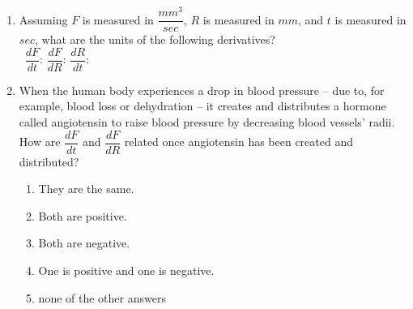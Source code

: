 \documentclass[10pt]{article}
\begin{document}
\begin{enumerate}
\item[(a)] Assuming $F$ is measured in $\dfrac{mm^3}{sec}$, $R$ is measured in $mm$, and $t$ is measured in $sec$, what are the units of the following derivatives?\\
\,
\hfill
{\large $\dfrac{dF}{dt}$:}
\hfill
{\large $\dfrac{dF}{dR}$: }
\hfill
{\large $\dfrac{dR}{dt}$: }
\hfill
\,\\[0.2in]

\item[(b)] When the human body experiences a drop in blood pressure -- due to, for example, blood loss or dehydration -- it creates and distributes a hormone called angiotensin to raise blood pressure by decreasing blood vessels' radii. How are $\dfrac{dF}{dt}$ and $\dfrac{dF}{dR}$ related once angiotensin has been created and distributed?\\

\begin{enumerate}
\item[A.] They are the same.
\item[B.] Both are positive.
\item[C.] Both are negative.
\item[D.] One is positive and one is negative.
\item[E.] none of the other answers\\
\end{enumerate}



\end{enumerate}
\end{document}

